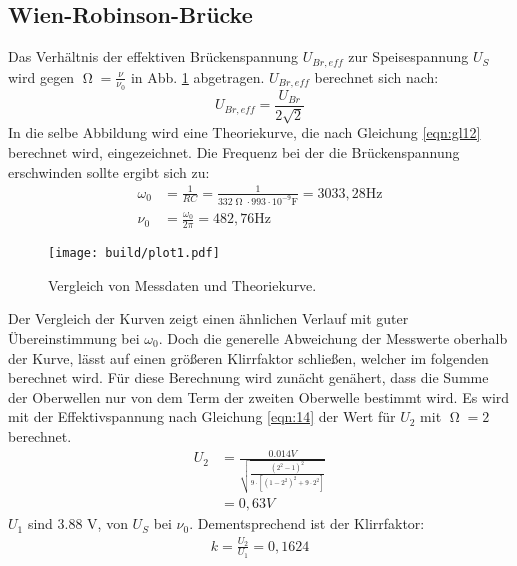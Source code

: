 \subsection{Wien-Robinson-Brücke}
\label{sec:Wien}
Das Verhältnis der effektiven Brückenspannung $U_{Br,eff}$ zur Speisespannung $U_S$ wird gegen $\upOmega = \frac{\nu}{\nu_0}$ in Abb. \ref{fig:plot} abgetragen.
$U_{Br,eff}$ berechnet sich nach:
\begin{equation}
  U_{Br,eff} = \frac{U_{Br}}{2 \sqrt{2}}
  \label{eqn:eff}
\end{equation}
In die selbe Abbildung wird eine Theoriekurve, die nach Gleichung \eqref{eqn:gl12} berechnet wird, eingezeichnet.
Die Frequenz bei der die Brückenspannung erschwinden sollte ergibt sich zu:
\begin{align*}
  \omega_0 &= \frac{1}{RC} = \frac{1}{332 \upOmega \cdot 993 \cdot 10^{-9} \textrm{F}} = 3033,28 \textrm{Hz} \\
  \nu_0 &= \frac{\omega_0}{2 \pi} = 482,76 \textrm{Hz}
\end{align*}
\newpage
\begin{figure}
  \centering
  \texttt{[image: build/plot1.pdf]}
  \caption{Vergleich von Messdaten und Theoriekurve.}
  \label{fig:plot}
\end{figure}
\noindent
Der Vergleich der Kurven zeigt einen ähnlichen Verlauf mit guter Übereinstimmung bei $\omega_0$.
Doch die generelle Abweichung der Messwerte oberhalb der Kurve, lässt auf einen größeren Klirrfaktor schließen, welcher im folgenden berechnet wird.
Für diese Berechnung wird zunächt genähert, dass die Summe der Oberwellen nur von dem Term der zweiten Oberwelle bestimmt wird.
Es wird mit der Effektivspannung nach Gleichung \ref{eqn:14} der Wert für $U_2$ mit $\upOmega = 2$ berechnet.
\begin{align*}
  U_2 &= \frac{0.014 V}{\sqrt{\frac{(2^2-1)^2}{9 \cdot [(1-2^2)^2+9 \cdot 2^2]}}} \\
  &= 0,63 V
\end{align*}
$U_1$ sind 3.88 V, von $U_S$ bei $\nu_0$.
Dementsprechend ist der Klirrfaktor:
\begin{align*}
  k = \frac{U_2}{U_1} = 0,1624
\end{align*}
